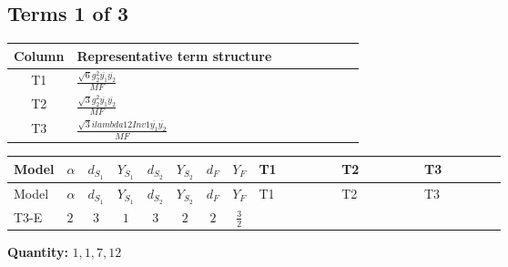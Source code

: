 \documentclass[8pt]{article}
\begin{document}
\begin{landscape}
\subsection*{Terms 1 of 3}
\begin{center}
\begin{tabular}{@{}c >{\raggedright\arraybackslash}p{0.82\linewidth}@{}}
\toprule
Column & Representative term structure \\
\midrule
T1 & \(\displaystyle \frac{\sqrt{6} g_{2}^{2} \overline{y_{1}} \overline{y_{2}}}{MF}\) \\
\midrule
T2 & \(\displaystyle \frac{\sqrt{3} g_{2}^{2} \overline{y_{1}} \overline{y_{2}}}{MF}\) \\
\midrule
T3 & \(\displaystyle \frac{\sqrt{3} i lambda12Inv1 \overline{y_{1}} \overline{y_{2}}}{MF}\) \\
\midrule
\bottomrule
\end{tabular}
\end{center}
\smallskip
\tiny
\begin{longtable}{@{}llcccccc >{\raggedright\arraybackslash}p{0.21\linewidth} >{\raggedright\arraybackslash}p{0.21\linewidth} >{\raggedright\arraybackslash}p{0.21\linewidth}@{}}
\toprule
Model & $\alpha$ & $d_{S_1}$ & $Y_{S_1}$ & $d_{S_2}$ & $Y_{S_2}$ & $d_F$ & $Y_F$ & T1 & T2 & T3 \\
\midrule
\endfirsthead
\toprule
Model & $\alpha$ & $d_{S_1}$ & $Y_{S_1}$ & $d_{S_2}$ & $Y_{S_2}$ & $d_F$ & $Y_F$ & T1 & T2 & T3 \\
\midrule
\endhead
T3-E & $2$ & $3$ & $1$ & $3$ & $2$ & $2$ & $\frac{3}{2}$ & \scriptsize\adjustbox{max width=\linewidth}{$\begin{gathered} - \frac{\sqrt{6} g_{2}^{2} \overline{y_{1}} \overline{y_{2}}}{3 MF}\end{gathered}$} & \scriptsize\adjustbox{max width=\linewidth}{$\begin{gathered} - \frac{\sqrt{3} g_{2}^{2} \overline{y_{1}} \overline{y_{2}}}{6 MF}\end{gathered}$} & \scriptsize\adjustbox{max width=\linewidth}{$\begin{gathered} - \frac{\sqrt{3} i lambda12Inv1 \overline{y_{1}} \overline{y_{2}}}{6 MF}\end{gathered}$} \\
\midrule
\bottomrule
\end{longtable}
\clearpage
\noindent\textbf{Quantity: }$\mathrm{1,1,7,12}$\par\smallskip

\end{landscape}
\end{document}
